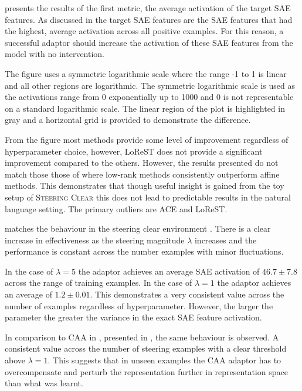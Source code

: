  presents the results of the first metric, the average activation of the target SAE features.
As discussed in  the target SAE features are the SAE features that had the highest, average activation across all positive examples.
For this reason, a successful adaptor should increase the activation of these SAE features from the model with no intervention.

The figure uses a symmetric logarithmic scale where the range -1 to 1 is linear and all other regions are logarithmic.
The symmetric logarithmic scale is used as the activations range from 0 exponentially up to 1000 and 0 is not representable on a standard logarithmic scale.
The linear region of the plot is highlighted in gray and a horizontal grid is provided to demonstrate the difference.

From the figure most methods provide some level of improvement regardless of hyperparameter choice, however, LoReST does not provide a significant improvement compared to the others.
However, the results presented do not match those those of \citet{steering-clear} where low-rank methods consistently outperform affine methods.
This demonstrates that though useful insight is gained from the toy setup of \textsc{Steering Clear} this does not lead to predictable results in the natural language setting.
The primary outliers are ACE and LoReST.

 matches the behaviour in the steering clear environment .
There is a clear increase in effectiveness as the steering magnitude $\lambda$ increases and the performance is constant across the number examples with minor fluctuations.

In the case of $\lambda = 5$ the adaptor achieves an average SAE activation of $46.7 \pm 7.8$ across the range of training examples.
In the case of $\lambda = 1$ the adaptor achieves an average of $1.2 \pm 0.01$.
This demonstrates a very consistent value across the number of examples regardless of hyperparameter.
However, the larger the parameter the greater the variance in the exact SAE feature activation.

In comparison to CAA in \citet{steering-clear}, presented in , the same behaviour is observed.
A consistent value across the number of steering examples with a clear threshold above $\lambda = 1$.
This suggests that in unseen examples the CAA adaptor has to overcompensate and perturb the representation further in representation space than what was learnt.

